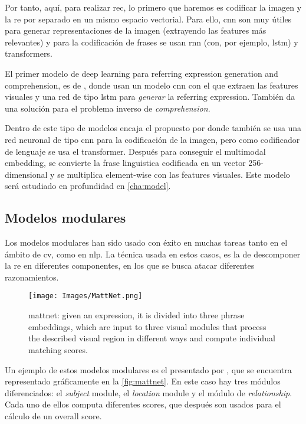 Por tanto, aquí, para realizar \gls{rec}, lo primero que haremos es codificar
la imagen y la \gls{re} por separado en un mismo espacio vectorial. Para ello,
\gls{cnn} son muy útiles para generar representaciones de la imagen (extrayendo
las features más relevantes) y para la codificación de frases se usan \gls{rnn}
(con, por ejemplo, \gls{lstm}) y transformers.

El primer modelo de deep learning para referring expression generation and
comprehension, es de , donde usan un modelo \gls{cnn} con
el que extraen las features visuales y una red de tipo \gls{lstm} para
\emph{generar} la referring expression. También da una solución para el
problema inverso de \emph{comprehension}.

Dentro de este tipo de modelos encaja el propuesto por
 donde también se usa una red neuronal de tipo
\gls{cnn} para la codificación de la imagen, pero como codificador de lenguaje
se usa el transformer. Después para conseguir el multimodal embedding, se
convierte la frase linguistica codificada en un vector 256-dimensional y se
multiplica element-wise con las features visuales. Este modelo será estudiado
en profundidad en \vref{cha:model}.

\subsection{Modelos modulares} \label{sec:modular}
Los modelos modulares han sido usado con éxito en muchas tareas tanto en el
ámbito de \gls{cv}, como en \gls{nlp}. La técnica usada en estos casos, es la
de descomponer la \gls{re} en diferentes componentes, en los que se busca
atacar diferentes razonamientos.

\begin{figure}[ht]
  \centering
  \texttt{[image: Images/MattNet.png]}
  \caption[\acl*{mattnet}]{\gls{mattnet}: given an expression, it is divided
    into three phrase embeddings, which are input to three visual modules that
    process the described visual region in different ways and compute
    individual matching scores.}
  \label{fig:mattnet}
\end{figure}

Un ejemplo de estos modelos modulares es el presentado por ,
que se encuentra representado gráficamente en la \vref{fig:mattnet}. En este
caso hay tres módulos diferenciados: el \emph{subject} module, el
\emph{location} module y el módulo de \emph{relationship}. Cada uno de ellos
computa diferentes scores, que después son usados para el cálculo de un overall
score.

